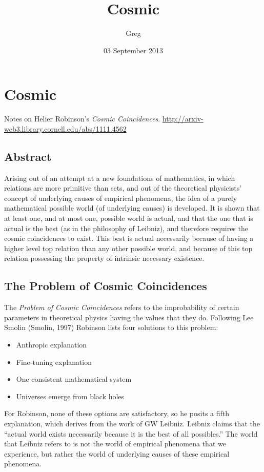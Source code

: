 \documentclass[11pt]{article}
\title{Cosmic}
\author{Greg}
\date{03 September 2013}
\begin{document}
\maketitle

\setcounter{tocdepth}{3}
\tableofcontents
\vspace*{1cm}
\section{Cosmic}
\label{sec-1}

Notes on Helier Robinson's \emph{Cosmic Coincidences}.
\href{http://arxiv-web3.library.cornell.edu/abs/1111.4562}{http://arxiv-web3.library.cornell.edu/abs/1111.4562}
\subsection{Abstract}
\label{sec-1.1}

   Arising out of an attempt at a new foundations of mathematics, in which relations are more primitive than sets, and out of the theoretical physicists' concept of underlying causes of empirical phenomena, the idea of a purely mathematical possible world (of underlying causes) is developed. It is shown that at least one, and at most one, possible world is actual, and that the one that is actual is the best (as in the philosophy of Leibniz), and therefore requires the cosmic coincidences to exist. This best is actual necessarily because of having a higher level top relation than any other possible world, and because of this top relation possessing the property of intrinsic necessary existence. 
\subsection{The Problem of Cosmic Coincidences}
\label{sec-1.2}

The \emph{Problem of Cosmic Coincidences} refers to the improbability
of certain parameters in theoretical physics having the values
that they do. Following Lee Smolin (Smolin, 1997) Robinson lists
four solutions to this problem:

\begin{itemize}
\item Anthropic explanation
\item Fine-tuning explanation
\item One consistent mathematical system
\item Universes emerge from black holes
\end{itemize}
For Robinson, none of these options are satisfactory, so he posits
a fifth explanation, which derives from the work of GW Leibniz.
Leibniz claims that the ``actual world exists necessarily because
it is the best of all possibles.'' The world that Leibniz refers
to is not the world of empirical phenomena that we experience, but
rather the world of underlying causes of these empirical phenomena.
\end{document}
